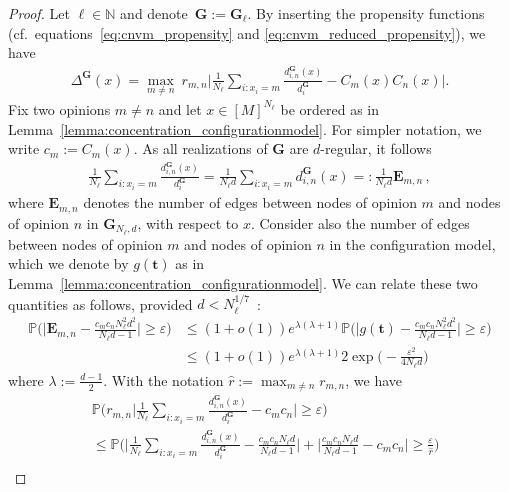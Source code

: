 \documentclass[a4paper,
               10pt,
               pdftex,
               normalheadings,
               headsepline,
               footsepline,
               headinclude,
               footinclude,
               DIV=14,
               abstracton]
{scrartcl}
\newcommand{\rv}[1]{\bm{#1}}
\begin{document}
\begin{proof}
Let $\ell \in \mathbb{N}$ and denote~$\rv{G} := \rv{G}_\ell$. By inserting the propensity functions (cf.\ equations~\eqref{eq:cnvm_propensity} and \eqref{eq:cnvm_reduced_propensity}), we have
\begin{align}
        \Delta^{\rv{G}}(x) = \max_{m\neq n}\  r_{m,n} \Big\lvert \frac{1}{N_\ell} \sum_{i : x_{i} = m} \frac{d^{\rv{G}}_{i,n}(x)}{d^{\rv{G}}_i} - C_m(x) C_n(x) \Big\rvert.
    \end{align}
Fix two opinions $m\neq n$ and let $x \in [M]^{N_\ell}$ be ordered as in Lemma~\ref{lemma:concentration_configurationmodel}. For simpler notation, we write $c_m := C_m(x)$. As all realizations of $\rv{G}$ are $d$-regular, it follows
\begin{align}
    \frac{1}{N_\ell} \sum_{i : x_{i} = m} \frac{d^{\rv{G}}_{i,n}(x)}{d^{\rv{G}}_i} = \frac{1}{N_\ell d} \sum_{i : x_{i} = m} d^{\rv{G}}_{i,n}(x) =: \frac{1}{N_\ell d} \rv{E}_{m,n} \, ,
\end{align}
where $\rv{E}_{m,n}$ denotes the number of edges between nodes of opinion $m$ and nodes of opinion $n$ in $\rv{G}_{N_\ell, d}$, with respect to $x$.
Consider also the number of edges between nodes of opinion $m$ and nodes of opinion $n$ in the configuration model, which we denote by $g(\rv{t})$ as in Lemma~\ref{lemma:concentration_configurationmodel}.
We can relate these two quantities as follows, provided $d < N_\ell^{1/7}$~\cite[Thm 11.3]{Frieze2015}:
\begin{align}
        \mathbb{P}\Big(\Big|\rv{E}_{m,n} - \frac{c_m c_n N_\ell^2 d^2}{N_\ell d - 1}\Big| \geq \varepsilon\Big)  &\leq   (1+o(1)) e^{\lambda(\lambda+1)} \mathbb{P}\Big(\Big|g(\rv{t}) - \frac{c_m c_n N_\ell^2 d^2}{N_\ell d - 1}\Big| \geq \varepsilon\Big) \\
        &\leq (1+o(1)) e^{\lambda(\lambda+1)} 2 \exp\Big(-\frac{\varepsilon^2}{4 N_\ell d}\Big) \label{eq:concentration_regular}
\end{align}
where $\lambda := \frac{d - 1}{2}$. With the notation $\hat{r} := \max_{m\neq n} r_{m,n}$, we have
\begin{align}
    &\mathbb{P}\Big( r_{m,n} \Big\lvert \frac{1}{N_\ell} \sum_{i : x_{i} = m} \frac{d^{\rv{G}}_{i,n}(x)}{d^{\rv{G}}_i} - c_{m}c_{n} \Big\rvert \geq \varepsilon\Big) \\
    &\leq \mathbb{P}\Big( \Big\lvert \frac{1}{N_\ell} \sum_{i : x_{i} = m} \frac{d^{\rv{G}}_{i,n}(x)}{d^{\rv{G}}_i} - \frac{c_m c_n N_\ell d}{N_\ell d - 1} \Big\rvert + \Big\lvert \frac{c_m c_n N_\ell d}{N_\ell d - 1} - c_{m}c_{n} \Big\rvert \geq \frac{\varepsilon}{\hat{r}} \Big)\\

\end{align}
\end{proof}
\end{document}

